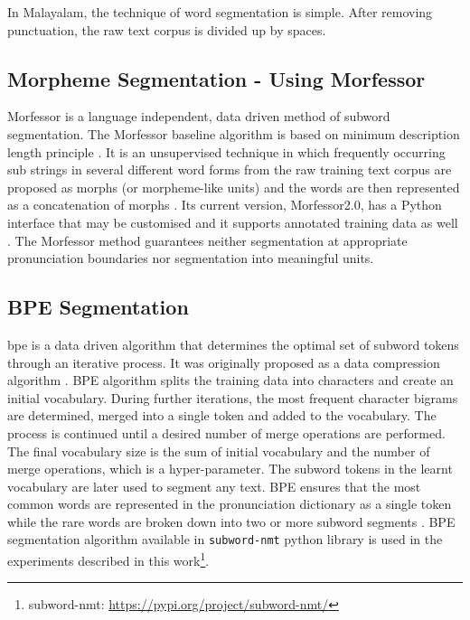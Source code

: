In Malayalam, the technique of word segmentation is simple. After removing
punctuation, the raw text corpus is divided up by spaces.


\subsection{Morpheme Segmentation - Using Morfessor}

Morfessor is a language independent, data driven method of subword
segmentation. The Morfessor baseline algorithm is based on minimum description
length principle \cite{creutz2002unsupervised}. It is an unsupervised technique
in which frequently occurring sub strings in several different word forms from
the raw training text corpus are proposed as morphs (or morpheme-like units)
and the words are then represented as a concatenation of morphs
\cite{creutz2007morph}. Its current version, Morfessor2.0, has a Python interface
that may be customised and it supports annotated training data as well
\cite{virpioja2013morfessor}. The Morfessor method guarantees neither
segmentation at appropriate pronunciation boundaries nor segmentation into
meaningful units.

\subsection{BPE Segmentation}

\gls{bpe} is a data driven algorithm that determines the optimal set of subword
tokens through an iterative process. It was originally proposed as a data
compression algorithm \cite{gage1994new}. BPE algorithm splits the training
data into characters and create an initial vocabulary. During further
iterations, the most frequent character bigrams are determined, merged into a
single token and added to the vocabulary. The process is continued until a
desired number of merge operations are performed. The final vocabulary size is
the sum of initial vocabulary and the number of merge operations, which is a
hyper-parameter. The subword tokens in the learnt vocabulary are later used to
segment any text. BPE ensures that the most common words are represented in the
pronunciation dictionary as a single token while the rare words are broken down
into two or more subword segments \cite{sennrich-etal-2016-neural}. BPE
segmentation algorithm available in \texttt{subword-nmt} python library is used
in the experiments described in this work\footnote{subword-nmt:
    \url{https://pypi.org/project/subword-nmt/}}.


